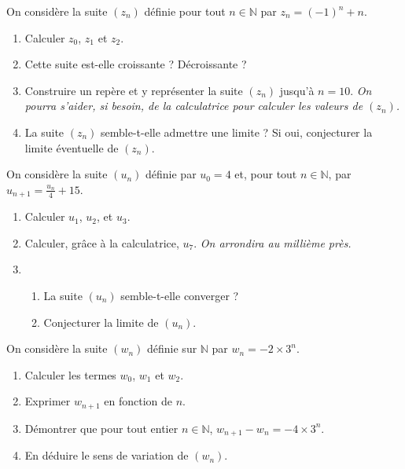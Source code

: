 \documentclass[11pt]{article}
\begin{document}
\begin{exo}[$2$ points]
  On considère la suite $(z_n)$ définie pour tout $n\in\mathbb{N}$ par
  $z_n=(-1)^n+n$.
  \begin{enumerate}
    \item Calculer $z_0$, $z_1$ et $z_2$.
    \item Cette suite est-elle croissante ? Décroissante ?
    \item Construire un repère et y représenter la suite $(z_n)$ jusqu'à $n=10$.
      \emph{On pourra s'aider, si besoin, de la calculatrice pour calculer les
        valeurs de $(z_n)$.}
    \item La suite $(z_n)$ semble-t-elle admettre une limite ? Si oui,
      conjecturer la limite éventuelle de $(z_n)$.
  \end{enumerate}
\end{exo}

\vspace{2cm}\setcounter{exo}{0}

\begin{exo}[$2$ points]
  On considère la suite $(u_n)$ définie par $u_0=4$ et, pour tout
  $n\in\mathbb{N}$, par $u_{n+1}=\frac{u_n}{4}+15$.
  \begin{enumerate}
    \item Calculer $u_1$, $u_2$, et $u_3$.
    \item Calculer, gr\^ace à la calculatrice, $u_{7}$. \emph{On arrondira au
      millième près.}
    \item \begin{enumerate}
        \item La suite $(u_n)$ semble-t-elle converger ?
        \item Conjecturer la limite de $(u_n)$.
      \end{enumerate}
  \end{enumerate}
\end{exo}

\begin{exo}[$3$ points]
  On considère la suite $(w_n)$ définie sur $\mathbb{N}$ par $w_n=-2\times3^n$.
  \begin{enumerate}
    \item Calculer les termes $w_0$, $w_1$ et $w_2$.
    \item Exprimer $w_{n+1}$ en fonction de $n$.
    \item Démontrer que pour tout entier $n\in\mathbb{N}$,
      $w_{n+1}-w_n=-4\times3^n$.
    \item En déduire le sens de variation de $(w_n)$.
  \end{enumerate}
\end{exo}
\end{document}
